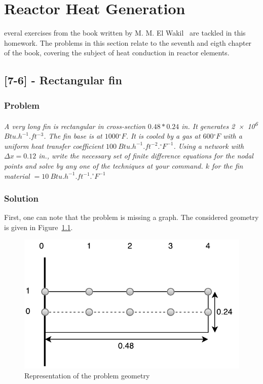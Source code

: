 %
%
\let\textcircled=\pgftextcircled
\chapter{Reactor Heat Generation}
\label{chap:intro}

everal exercises from the book written by M. M. El Wakil~\cite{book01} are tackled in this homework. The problems in this section relate to the seventh and eigth chapter of the book, covering the subject of heat conduction in reactor elements.

\section{[7-6] - Rectangular fin}
\label{prob71}

\subsection{Problem}
\textit{A very long fin is rectangular in cross-section $0.48 * 0.24$ in. It generates \num{2e6} $Btu.h^{-1}.ft^{-3}$. The fin base is at $1000{}^\circ F$. It is cooled by a gas at $600{}^\circ F$ with a uniform heat transfer coefficient $100\ Btu.h^{-1}.ft^{-2}.{}^\circ F^{-1}$. Using a network with $\Delta x = 0.12$ in., write the necessary set of finite difference equations for the nodal points and solve by any one of the techniques at your command. $k$ for the fin material $= 10\ Btu.h^{-1}.ft^{-1}.{}^\circ F^{-1}$}

\subsection{Solution}

First, one can note that the problem is missing a graph. The considered geometry is given in Figure~\ref{fig71}.

\begin{figure}[H]
\centering
\includegraphics[scale=1]{fig/schema.pdf}
\caption{Representation of the problem geometry}
\label{fig71}
\end{figure}

